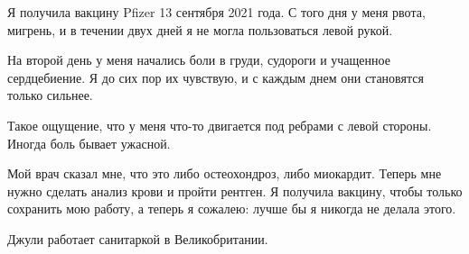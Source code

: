 Я получила вакцину Pfizer 13 сентября 2021 года. С того дня у меня рвота,
мигрень, и в течении двух дней я не могла пользоваться левой рукой.

На второй день у меня начались боли в груди, судороги и учащенное
сердцебиение. Я до сих пор их чувствую, и с каждым днем они становятся только
сильнее.

Такое ощущение, что у меня что-то двигается под ребрами с левой стороны. Иногда
боль бывает ужасной.

Мой врач сказал мне, что это либо остеохондроз, либо миокардит. Теперь мне нужно
сделать анализ крови и пройти рентген. Я получила вакцину, чтобы только
сохранить мою работу, а теперь я сожалею: лучше бы я никогда не делала этого.

Джули работает санитаркой в Великобритании.


